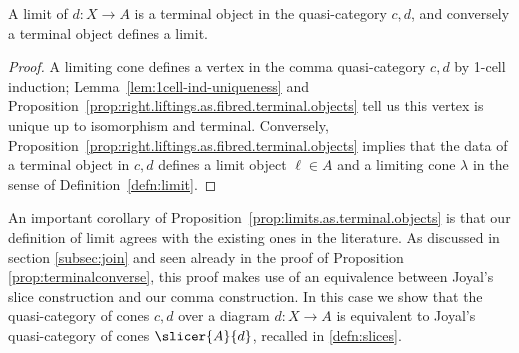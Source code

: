 \begin{prop}\label{prop:limits.as.terminal.objects} A limit of $d \colon X \to A$ is a terminal object in the quasi-category $c\comma d$, and conversely a terminal object defines a limit.
\end{prop}
\begin{proof}
A limiting cone defines a vertex in the comma quasi-category $c\comma d$ by 1-cell induction; Lemma~\ref{lem:1cell-ind-uniqueness} and Proposition~\ref{prop:right.liftings.as.fibred.terminal.objects} tell us this vertex is unique up to isomorphism and terminal. Conversely, Proposition~\ref{prop:right.liftings.as.fibred.terminal.objects} implies that the data of a terminal object in $c\comma d$ defines a limit object $\ell\in A$ and a limiting cone $\lambda$ in the sense of Definition~\ref{defn:limit}.
\end{proof}

An important corollary of Proposition~\ref{prop:limits.as.terminal.objects} is that our definition of limit agrees with the existing ones in the literature. As discussed in section \ref{subsec:join} and seen already in the proof of Proposition \ref{prop:terminalconverse}, this proof makes use of an equivalence between Joyal's slice construction and our comma construction. In this case we show that the quasi-category of cones $c \comma d$ over a diagram $d \colon X \to A$ is equivalent to Joyal's quasi-category of cones $\slicer{A}{d}$, recalled in \ref{defn:slices}. 

